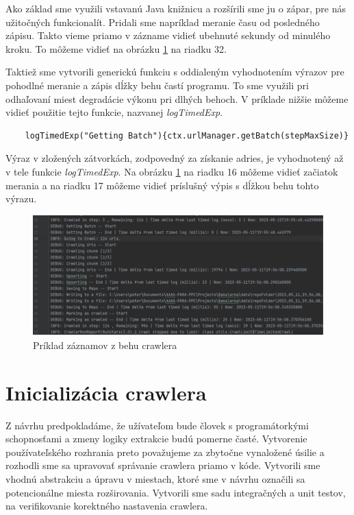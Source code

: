 Ako základ sme využili vstavanú Java knižnicu a rozšírili sme ju o zápar, pre nás užitočných funkcionalít. Pridali sme napríklad meranie času od posledného zápisu. Takto vieme priamo v zázname vidieť ubehnuté sekundy od minulého kroku. To môžeme vidieť na obrázku \ref{o:logExample} na riadku 32.

Taktiež sme vytvorili generickú funkciu s oddialeným vyhodnotením výrazov pre pohodlné meranie a zápis dĺžky behu častí programu. To sme využili pri odhaľovaní miest degradácie výkonu pri dlhých behoch. V príklade nižšie môžeme vidieť použitie tejto funkcie, nazvanej \textit{logTimedExp}. 

\begin{lstlisting}
    logTimedExp("Getting Batch"){ctx.urlManager.getBatch(stepMaxSize)}
\end{lstlisting}

Výraz v zložených zátvorkách, zodpovedný za získanie adries, je vyhodnotený až v tele funkcie \textit{logTimedExp}. Na obrázku \ref{o:logExample} na riadku 16 môžeme vidieť začiatok merania a na riadku 17 môžeme vidieť príslušný výpis s dĺžkou behu tohto výrazu. 

\begin{figure}[!ht]
    \centering
    \includegraphics[width=1\textwidth]{figures/logExample.png}
    \caption{Príklad záznamov z behu crawlera}
    \label{o:logExample}
\end{figure}

\section{Inicializácia crawlera}
Z návrhu predpokladáme, že užívateľom bude človek s programátorkými schopnosťami a zmeny logiky extrakcie budú pomerne časté. Vytvorenie používateľského rozhrania preto považujeme za zbytočne vynaložené úsilie a rozhodli sme sa upravovať správanie crawlera priamo v kóde. Vytvorili sme vhodnú abstrakciu a úpravu v miestach, ktoré sme v návrhu označili sa potencionálne miesta rozširovania. Vytvorili sme sadu integračných a unit testov, na verifikovanie korektného nastavenia crawlera. 

